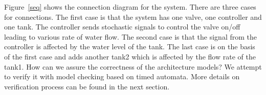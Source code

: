 Figure~\ref{seq} shows the connection diagram for the system. There are three cases for connections. The first case is that the system has one valve, one controller and one tank. The controller sends stochastic signals to control the valve on/off leading to various rate of water flow. The second case is that the signal from the controller is affected by the water level of the tank. The last case is on the basis of the first case and adds another tank2 which is affected by the flow rate of the tank1. How can we assure the correctness of the architecture models? We attempt to verify it with model checking based on timed automata. More details on verification process can be found in the next section.